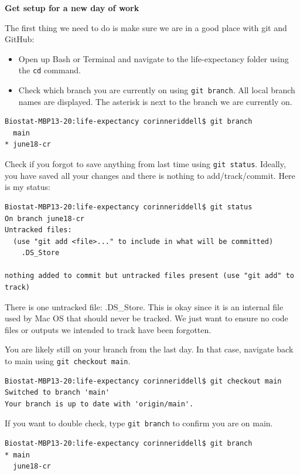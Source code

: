 \documentclass[
]{book}
\providecommand{\tightlist}{%
  \setlength{\itemsep}{0pt}\setlength{\parskip}{0pt}}
\begin{document}
\textbf{Get setup for a new day of work}

The first thing we need to do is make sure we are in a good place with git and
GitHub:

\begin{itemize}
\tightlist
\item
  Open up Bash or Terminal and navigate to the life-expectancy folder using
  the \texttt{cd} command.
\item
  Check which branch you are currently on using \texttt{git\ branch}. All local branch
  names are displayed. The asterisk is next to the branch we are currently on.
\end{itemize}

\begin{verbatim}
Biostat-MBP13-20:life-expectancy corinneriddell$ git branch
  main
* june18-cr
\end{verbatim}

Check if you forgot to save anything from last time using \texttt{git\ status}.
Ideally, you have saved all your changes and there is nothing to add/track/commit.
Here is my status:

\begin{verbatim}
Biostat-MBP13-20:life-expectancy corinneriddell$ git status
On branch june18-cr
Untracked files:
  (use "git add <file>..." to include in what will be committed)
    .DS_Store

nothing added to commit but untracked files present (use "git add" to track)
\end{verbatim}

There is one untracked file: .DS\_Store. This is okay since it is an internal
file used by Mac OS that should never be tracked. We just want to ensure
no code files or outputs we intended to track have been forgotten.

You are likely still on your branch from the last day. In that case, navigate
back to main using \texttt{git\ checkout\ main}.

\begin{verbatim}
Biostat-MBP13-20:life-expectancy corinneriddell$ git checkout main
Switched to branch 'main'
Your branch is up to date with 'origin/main'.
\end{verbatim}

If you want to double check, type \texttt{git\ branch} to confirm you are on
main.

\begin{verbatim}
Biostat-MBP13-20:life-expectancy corinneriddell$ git branch
* main
  june18-cr
\end{verbatim}
\end{document}
